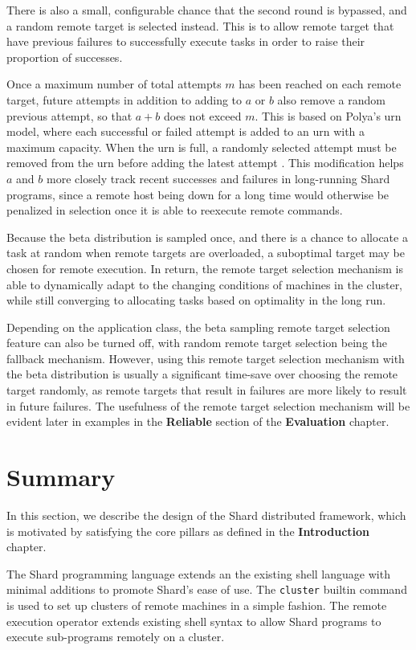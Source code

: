 \documentclass[oneside]{report}
\begin{document}
There is also a small, configurable chance that the second round is bypassed, and a random remote target is selected instead.
This is to allow remote target that have previous failures to successfully execute tasks in order to raise their proportion of successes.

Once a maximum number of total attempts $m$ has been reached on each remote target, future attempts in addition to adding to $a$ or $b$ also remove a random previous attempt, so that $a+b$ does not exceed $m$.
This is based on Polya's urn model, where each successful or failed attempt is added to an urn with a maximum capacity.
When the urn is full, a randomly selected attempt must be removed from the urn before adding the latest attempt \cite{chung2003generalizations}.
This modification helps $a$ and $b$ more closely track recent successes and failures in long-running Shard programs, since a remote host being down for a long time would otherwise be penalized in selection once it is able to reexecute remote commands.

Because the beta distribution is sampled once, and there is a chance to allocate a task at random when remote targets are overloaded, a suboptimal target may be chosen for remote execution.
In return, the remote target selection mechanism is able to dynamically adapt to the changing conditions of machines in the cluster, while still converging to allocating tasks based on optimality in the long run.

Depending on the application class, the beta sampling remote target selection feature can also be turned off, with random remote target selection being the fallback mechanism.
However, using this remote target selection mechanism with the beta distribution is usually a significant time-save over choosing the remote target randomly, as remote targets that result in failures are more likely to result in future failures.
The usefulness of the remote target selection mechanism will be evident later in examples in the \textbf{Reliable} section of the \textbf{Evaluation} chapter.

\section{Summary}

In this section, we describe the design of the Shard distributed framework, which is motivated by satisfying the core pillars as defined in the \textbf{Introduction} chapter.

The Shard programming language extends an the existing shell language with minimal additions to promote Shard's ease of use.
The \texttt{cluster} builtin command is used to set up clusters of remote machines in a simple fashion.
The remote execution operator extends existing shell syntax to allow Shard programs to execute sub-programs remotely on a cluster.
\end{document}
